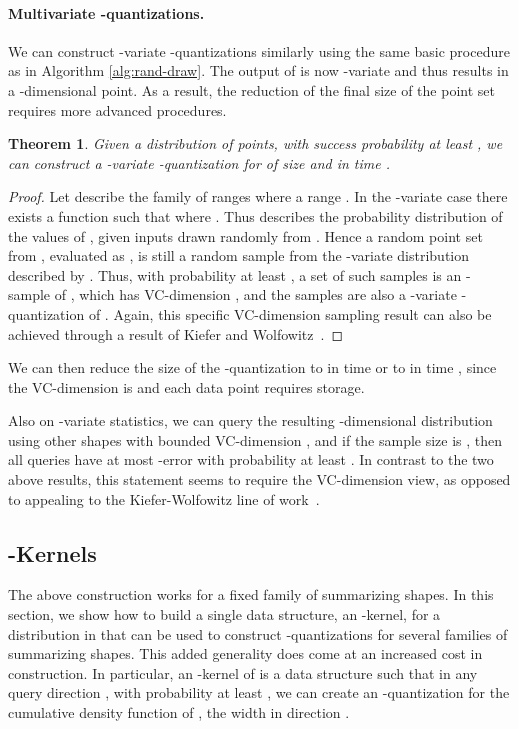 \documentclass{journal}
\newtheorem {theorem}{Theorem}[section]
\begin{document}
\paragraph{Multivariate -quantizations.}
We can construct -variate -quantizations similarly using the same basic procedure as in Algorithm \ref{alg:rand-draw}.
The output  of  is now -variate and thus results in a -dimensional point.
As a result, the reduction of the final size of the point set requires more advanced procedures.

\begin{theorem}
Given a distribution  of  points, with success probability at least , we can construct a -variate -quantization for 
of size  and in time . \label{thm:k-var-q}
\end{theorem}
\begin{proof}
Let  describe the family of ranges where a range .
In the -variate case there exists a function  such that  where .  Thus  describes the probability distribution of the values of , given inputs drawn randomly from .  Hence a random point set  from , evaluated as , is still a random sample from the -variate distribution described by .  Thus, with probability at least , a set of  such samples is an -sample of , which has VC-dimension , and the samples are also a -variate -quantization of .  Again, this specific VC-dimension sampling result can also be achieved through a result of Kiefer and Wolfowitz~\cite{KW58}.  
\end{proof}

We can then reduce the size of the -quantization  to  in  time \cite{Phi08} or to  in  time \cite{CM96}, since the VC-dimension is  and each data point requires  storage.


Also on -variate statistics, we can query the resulting -dimensional distribution using other shapes with bounded VC-dimension , and if the sample size is , then all queries have at most -error with probability at least .  In contrast to the two above results, this statement seems to require the VC-dimension view, as opposed to appealing to the Kiefer-Wolfowitz line of work~\cite{DKW56,KW58}.  





\subsection{-Kernels}
\label{sec:ea-kernel}

The above construction works for a fixed family of summarizing shapes.  In this section, we show how to build a single data structure, an -kernel, for a distribution  in  that can be used to construct -quantizations for several families of summarizing shapes. 
This added generality does come at an increased cost in construction.
In particular, an -kernel of  is a data structure such that in any query direction , with probability at least , we can create an -quantization for the cumulative density function of , the width in direction .
\end{document}
